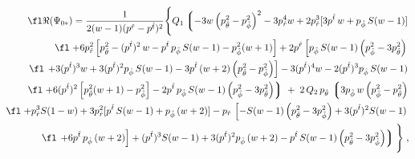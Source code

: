 \documentclass[12pt]{iopart}
\begin{document}
\begin{eqnarray}
\fl
\Re(\Psi_{0*}) = {1\over 2 (w-1) (p^{\hat r}-p^{\hat t})^2}
\Bigg\{
Q_1 \left\lgroup-3 w \left(p_{\hat \theta}^2-p_{\hat \phi}^2\right)^2-3 p_{\hat r}^4 w
+2 p_{\hat r}^3 [3 p^{\hat t} \,w+p_{\hat \phi} \,S (w-1)]
\right.\nonumber\\
\fl 
 \left.
    +6 p_{\hat r}^2 \left[p_{\hat \theta}^2-(p^{\hat t})^2\, w-p^{\hat t}\, p_{\hat \phi} \,S (w-1)-p_{\hat \phi}^2 (w+1)\right]
    +2 p^{\hat r} \left[p_{\hat \phi}\, S (w-1) \left(p_{\hat \phi}^2-3 p_{\hat \theta}^2\right)
\right.\right.\nonumber\\   
\fl \left. \left. 
+3 (p^{\hat t})^3 w
   +3 (p^{\hat t})^2 p_{\hat \phi}\, S (w-1)-3 p^{\hat t}\, (w+2)
   \left(p_{\hat \theta}^2-p_{\hat \phi}^2\right)\right]-3 (p^{\hat t})^4 w-2 (p^{\hat t})^3
   p_{\hat \phi}\, S (w-1)
\right. \nonumber\\
\fl \left.
+6 (p^{\hat t})^2 \left[p_{\hat \theta}^2 (w+1)-
   p_{\hat \phi}^2\right]
-2 p^{\hat t}\, p_{\hat \phi} \,S (w-1) \left(p_{\hat \phi}^2-3 p_{\hat \theta}^2\right)\right\rgroup \; + \; 
   2\,  Q_2\,p_{\hat \theta}\, \left\lgroup3 p_{\hat \phi}\, w \left(p_{\hat \phi}^2-p_{\hat \theta}^2\right)\right.
   \nonumber\\
\fl \left.
+p_{\hat r}^3 S(1- w)+3 p_{\hat r}^2 [p^{\hat t} \,S
   (w-1)+p_{\hat \phi}\, (w+2)]   -p_{\hat r}\, \left[-S (w-1) \left(p_{\hat \theta}^2-3
   p_{\hat \phi}^2\right) +3 (p^{\hat t})^2 S (w-1)
\right. \right.\nonumber\\
\fl \left.\left.
+6 p^{\hat t} \,p_{\hat \phi}\,
   (w+2)\right]
+(p^{\hat t})^3 S (w-1)+3 (p^{\hat t})^2 p_{\hat \phi} \,(w+2)-p^{\hat t}\, S (w-1)
   \left(p_{\hat \theta}^2-3 p_{\hat \phi}^2\right)\right\rgroup
   \Bigg\}  \;,
\label{eq:RePsios}
    \end{eqnarray}
\end{document}
